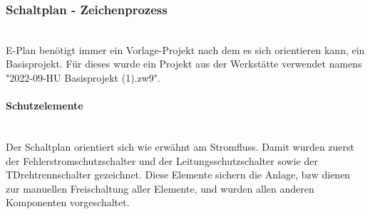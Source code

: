 \subsubsection{Schaltplan - Zeichenprozess}\mbox{}\\
    E-Plan benötigt immer ein Vorlage-Projekt nach dem es sich orientieren kann, ein Basisprojekt. Für dieses wurde ein Projekt aus der Werkstätte verwendet namens "2022-09-HU Basisprojekt (1).zw9".
    \paragraph{Schutzelemente }\mbox{}\\
    Der Schaltplan orientiert sich wie erwähnt am Stromfluss. Damit wurden zuerst der Fehlerstromschutzschalter und der Leitungsschutzschalter sowie der TDrehtrennschalter gezeichnet. Diese Elemente sichern die Anlage, bzw dienen zur manuellen Freischaltung aller Elemente, und wurden allen anderen Komponenten vorgeschaltet.
